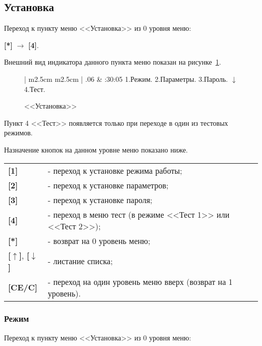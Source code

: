 \subsection{Установка}

Переход к пункту меню <<Установка>> из 0 уровня меню: 

\textbf{[*]} $\rightarrow$ \textbf{[4]}.

Внешний вид индикатора данного пункта меню показан на рисунке~\ref{fig:setup}.
 
 \begin{figure}[H]
 	\centering
 	
	\begin{tabular}{| m{2.5cm}  m{2.5cm} |}
		.06	& :30:05		\tabularnewline 
		 {1.Режим.} 		\tabularnewline
		 {2.Параметры.} 	\tabularnewline 
		 {3.Пароль.}		\tabularnewline \hline
		 {$\downarrow$}		\tabularnewline
		 {4.Тест.} 			\tabularnewline 
		\lasthline
	\end{tabular} 
	
	\caption{<<Установка>>}
	\label{fig:setup}
\end{figure}

Пункт 4 <<Тест>> появляется только при переходе в один из тестовых режимов. 

Назначение кнопок на данном уровне меню показано ниже.
\begin{center}
	\begin{tabular}{p{2cm} p{15cm}}
		\textbf{[1]} & - переход к установке режима работы;	\tabularnewline 
		\textbf{[2]} & - переход к установке параметров; \tabularnewline 
		\textbf{[3]} & - переход к установке пароля; \tabularnewline 
		\textbf{[4]} & - переход в меню тест (в режиме <<Тест 1>> или <<Тест 2>>); \tabularnewline 
		\textbf{[*]} & - возврат на 0 уровень меню; \tabularnewline
		\textbf{[$\uparrow$]}, \textbf{[$\downarrow$]}  & - листание списка; \tabularnewline
		\textbf{[CE/C]} & - переход на один уровень меню вверх (возврат на 1 уровень). \tabularnewline				
	\end{tabular} 
\end{center}

\subsubsection{Режим} \label{sssec:setup_regime}

Переход к пункту меню <<Установка>> из 0 уровня меню: 

